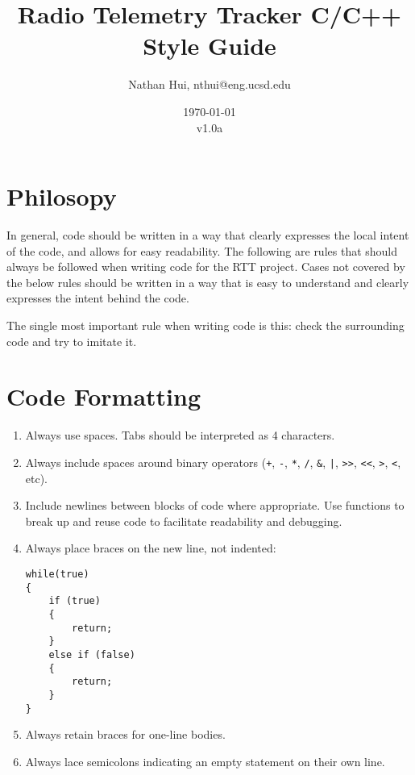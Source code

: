 \documentclass{article}
\title{Radio Telemetry Tracker C/C++ Style Guide}
\author{Nathan Hui, nthui@eng.ucsd.edu}
\date{\today\\v1.0a}
\begin{document}
\maketitle
\section{Philosopy}
In general, code should be written in a way that clearly expresses the local intent of the code, and allows for easy readability.  The following are rules that should always be followed when writing code for the RTT project.  Cases not covered by the below rules should be written in a way that is easy to understand and clearly expresses the intent behind the code.

The single most important rule when writing code is this: check the surrounding code and try to imitate it.
\section{Code Formatting}
\begin{enumerate}
    \item Always use spaces.  Tabs should be interpreted as 4 characters.
    \item Always include spaces around binary operators (\lstinline{+}, \lstinline{-}, \lstinline{*}, \lstinline{/}, \lstinline{&}, \lstinline{|}, \lstinline{>>}, \lstinline{<<}, \lstinline{>}, \lstinline{<}, etc).
    \item Include newlines between blocks of code where appropriate.  Use functions to break up and reuse code to facilitate readability and debugging.
    \item Always place braces on the new line, not indented:

\begin{lstlisting}[style=customc]
while(true)
{
    if (true)
    {
        return;
    }
    else if (false)
    {
        return;
    }
}
\end{lstlisting}

    \item Always retain braces for one-line bodies.
    \item Always lace semicolons indicating an empty statement on their own line.

\end{enumerate}
\end{document}
